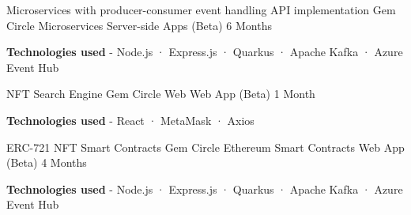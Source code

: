 \begin{cventries}
{\begin{cvitems}
      \end{cvitems}
    }
  \cventry
    {Microservices with producer-consumer event handling API implementation} %
    {Gem Circle Microservices} %
    {Server-side Apps (Beta)} %
    {6 Months} %
    {
      \begin{cvitems} %
        \item {\textbf{Technologies used} \hspace{0.03cm} - \hspace{0.03cm} Node.js \hspace{0.03cm} · \hspace{0.03cm} Express.js \hspace{0.03cm} · \hspace{0.03cm} Quarkus \hspace{0.03cm} · \hspace{0.03cm} Apache Kafka \hspace{0.03cm} · \hspace{0.03cm} Azure Event Hub \\}
      \end{cvitems}
    }
  \cventry
    {NFT Search Engine} %
    {Gem Circle Web} %
    {Web App (Beta)} %
    {1 Month} %
    {
      \begin{cvitems} %
        \item {\textbf{Technologies used} \hspace{0.03cm} - \hspace{0.03cm} React \hspace{0.03cm} · \hspace{0.03cm} MetaMask \hspace{0.03cm} · \hspace{0.03cm} Axios \\}
      \end{cvitems}
    }
  \cventry
    {ERC-721 NFT Smart Contracts} %
    {Gem Circle Ethereum Smart Contracts} %
    {Web App (Beta)} %
    {4 Months} %
    {
      \begin{cvitems} %
        \item {\textbf{Technologies used} \hspace{0.03cm} - \hspace{0.03cm} Node.js \hspace{0.03cm} · \hspace{0.03cm} Express.js \hspace{0.03cm} · \hspace{0.03cm} Quarkus \hspace{0.03cm} · \hspace{0.03cm} Apache Kafka \hspace{0.03cm} · \hspace{0.03cm} Azure Event Hub \\}

\end{cvitems}}
\end{cventries}
